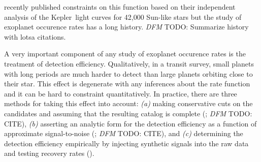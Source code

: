 \documentclass[12pt,preprint]{aastex}
\newcommand{\project}[1]{{\sffamily #1}}
\newcommand{\kepler}{\project{Kepler}}
\newcommand{\todo}[3]{{\color{#2} \emph{#1} TODO: #3}}
\newcommand{\dfmtodo}[1]{\todo{DFM}{red}{#1}}
\begin{document}
\citet{petigura} recently published constraints on this function based on
their independent analysis of the \kepler\ light curves for 42,000 Sun-like
stars but the study of exoplanet occurence rates has a long history.
\dfmtodo{Summarize history with lotsa citations.}

A very important component of any study of exoplanet occurence rates is the
treatment of detection efficiency.
Qualitatively, in a transit survey, small planets with long periods are much
harder to detect than large planets orbiting close to their star.
This effect is degenerate with any inferences about the rate function and it
can be hard to constraint quantitatively.
In practice, there are three methods for taking this effect into account:
\emph{(a)} making conservative cuts on the candidates and assuming that the
resulting catalog is complete (\citealt{catanzarite, traub}; \dfmtodo{CITE}),
\emph{(b)} asserting an analytic form for the detection efficiency as a
function of approximate signal-to-noise (\citealt{howard, dressing, dong,
fressin-fp, morton-swift}; \dfmtodo{CITE}), and \emph{(c)} determining the
detection efficiency empirically by injecting synthetic signals into the raw
data and testing recovery rates (\citealt{petigura-a, petigura}).
\end{document}
